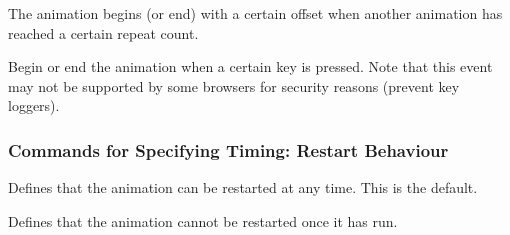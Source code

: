\begin{command}{\pgfsys@animation@repeat@event{}}
  The animation begins (or end) with a certain offset when another
  animation has reached a certain repeat count. 
\begin{codeexample}[width=4cm]
\end{codeexample}
\end{command}

\begin{command}{\pgfsys@animation@accesskey{}}
  Begin or end the animation when a certain key is pressed. Note that
  this event may not be supported by some browsers for security
  reasons (prevent key loggers). 
\begin{codeexample}[width=2cm]
\end{codeexample}
\end{command}



\subsubsection{Commands for Specifying Timing: Restart Behaviour}

\begin{command}{\pgfsys@animation@restart@always}
  Defines that the animation can be restarted at any time. This is the
  default.
\begin{codeexample}[width=2cm]
\end{codeexample}
\end{command}

\begin{command}{\pgfsys@animation@restart@never}
  Defines that the animation cannot be restarted once it has run.
\begin{codeexample}[width=2cm]
\end{codeexample}
\end{command}

